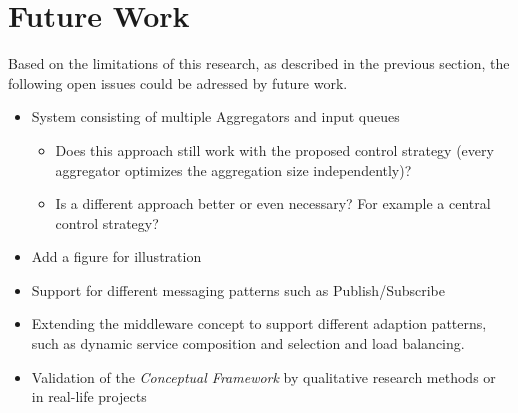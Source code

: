 \section{Future Work}

Based on the limitations of this research, as described in the previous section, the following open issues could be adressed by future work.

\begin{itemize}
	\item System consisting of multiple Aggregators and input queues
	\begin{itemize}
		\item Does this approach still work with the proposed control strategy (every aggregator optimizes the aggregation size independently)?
		\item Is a different approach better or even necessary? For example a central control strategy?
	\end{itemize}
	\item Add a figure for illustration
	\item Support for different messaging patterns such as Publish/Subscribe
	\item Extending the middleware concept to support different adaption patterns, such as dynamic service composition and selection and load balancing.
	\item Validation of the \emph{Conceptual Framework} by qualitative research methods or in real-life projects
\end{itemize}